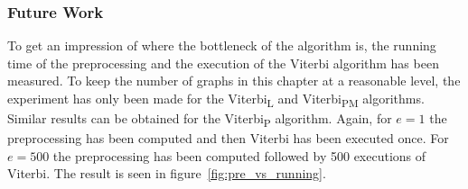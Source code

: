 \subsubsection{Future Work}

To get an impression of where the bottleneck of the algorithm is, the running
time of the preprocessing and the execution of the Viterbi algorithm has been
measured. To keep the number of graphs in this chapter at a reasonable level,
the experiment has only been made for the Viterbi\textsubscript{L} and
Viterbi\textsubscript{PM} algorithms. Similar results can be obtained for the
Viterbi\textsubscript{P} algorithm. Again, for $e = 1$ the preprocessing has
been computed and then Viterbi has been executed once. For $e = 500$ the
preprocessing has been computed followed by 500 executions of Viterbi. The
result is seen in figure~\ref{fig:pre_vs_running}.

